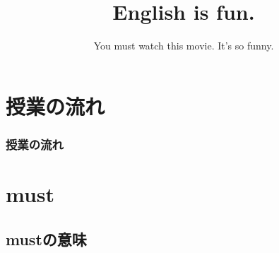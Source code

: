 \documentclass[aspectratio=169,xcolor={dvipsnames,table}]{beamer}
\title{English is fun.}
\subtitle{You must watch this movie. It's so funny.}
\author{}
\institute[]{}
\date[]
\begin{document}
\begin{frame}[plain]
  \titlepage
\end{frame}

\section*{授業の流れ}
\begin{frame}[plain]
  \frametitle{授業の流れ}
  \tableofcontents
\end{frame}


\section{must}

\subsection{mustの意味}
\end{document}
